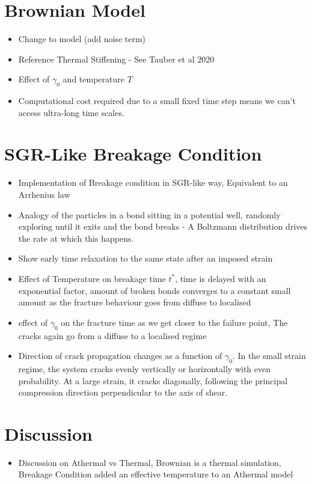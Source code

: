 \documentclass{library/duthesis}
\begin{document}
\section{Brownian Model}
\begin{itemize}
    \item Change to model (add noise term)
    \item Reference Thermal Stiffening - See Tauber et al 2020
    \item Effect of $\gamma_0$ and temperature $T$
    \item Computational cost required due to a small fixed time step means we can't access ultra-long time scales.
\end{itemize}

\section{SGR-Like Breakage Condition}
\begin{itemize}
    \item Implementation of Breakage condition in SGR-like way, Equivalent to an Arrhenius law
    \item Analogy of the particles in a bond sitting in a potential well, randomly exploring until it exits and the bond breaks - A Boltzmann distribution drives the rate at which this happens.
    \item Show early time relaxation to the same state after an imposed strain
    \item Effect of Temperature on breakage time $t^*$, time is delayed with an exponential factor, amount of broken bonds converges to a constant small amount as the fracture behaviour goes from diffuse to localised
    \item effect of $\gamma_0$ on the fracture time as we get closer to the failure point, The cracks again go from a diffuse to a localised regime
    \item Direction of crack propagation changes as a function of $\gamma_0$. In the small strain regime, the system cracks evenly vertically or horizontally with even probability. At a large strain, it cracks diagonally, following the principal compression direction perpendicular to the axis of shear.
\end{itemize}

\section{Discussion}
\begin{itemize}
    \item Discussion on Athermal vs Thermal, Brownian is a thermal simulation, Breakage Condition added an effective temperature to an Athermal model
\end{itemize}
\end{document}
